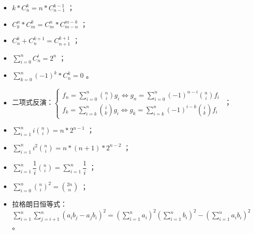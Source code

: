 \begin{itemize}
    \item $k *C^k_n=n*C^{k-1}_{n-1}$ ；
    \item $C_k^n*C_m^k=C_m^n*C_{m-n}^{m-k}$ ；
    \item $C_n^k+C_n^{k+1}=C_{n+1}^{k+1}$ ；
    \item $\sum_{i=0}^n C_n^i=2^n$ ；
    \item $\sum_{k=0}^n(-1)^k*C_n^k=0$ 。
    \item 二项式反演：$\left\{\begin{matrix} \displaystyle f_n=\sum_{i=0}^n{n\choose i}g_i\Leftrightarrow g_n=\sum_{i=0}^n(-1)^{n-i}{n\choose i}f_i \\
                  \displaystyle f_k=\sum_{i=k}^n{i\choose k}g_i\Leftrightarrow g_k=\sum_{i=k}^n(-1)^{i-k}{i\choose k}f_i\end{matrix}\right. $ ；
    \item $\displaystyle \sum_{i=1}^{n}i{n\choose i}=n * 2^{n-1}$ ；
    \item $\displaystyle \sum_{i=1}^{n}i^2{n\choose i}=n*(n+1)*2^{n-2}$ ；
    \item $\displaystyle \sum_{i=1}^{n}\dfrac{1}{i}{n\choose i}=\sum_{i=1}^{n}\dfrac{1}{i}$ ；
    \item $\displaystyle \sum_{i=0}^{n}{n\choose i}^2={2n\choose n}$ ；
    \item 拉格朗日恒等式：$\displaystyle \sum_{i=1}^{n}\sum_{j=i+1}^{n}(a_ib_j-a_jb_i)^2=(\sum_{i=1}^{n}a_i)^2(\sum_{i=1}^{n}b_i)^2-(\sum_{i=1}^{n}a_ib_i)^2$ 。
\end{itemize}